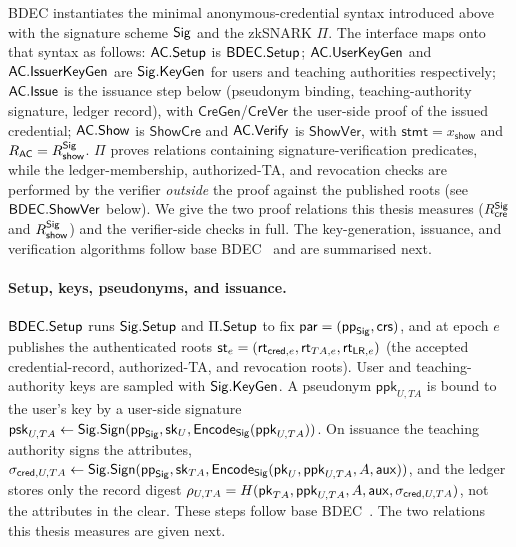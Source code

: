 \begin{construction}
BDEC instantiates the minimal anonymous-credential syntax introduced above with the signature scheme $\mathsf{Sig}$ and the zkSNARK $\Pi$. The interface maps onto that syntax as follows: $\mathsf{AC}.\mathsf{Setup}$ is $\mathsf{BDEC}.\mathsf{Setup}$; $\mathsf{AC}.\mathsf{UserKeyGen}$ and $\mathsf{AC}.\mathsf{IssuerKeyGen}$ are $\mathsf{Sig}.\mathsf{KeyGen}$ for users and teaching authorities respectively; $\mathsf{AC}.\mathsf{Issue}$ is the issuance step below (pseudonym binding, teaching-authority signature, ledger record), with $\mathsf{CreGen}$/$\mathsf{CreVer}$ the user-side proof of the issued credential; $\mathsf{AC}.\mathsf{Show}$ is $\mathsf{ShowCre}$ and $\mathsf{AC}.\mathsf{Verify}$ is $\mathsf{ShowVer}$, with $\mathsf{stmt}=x_{\mathsf{show}}$ and $R_{\mathsf{AC}}=R_{\mathsf{show}}^{\mathsf{Sig}}$. $\Pi$ proves relations containing signature-verification predicates, while the ledger-membership, authorized-TA, and revocation checks are performed by the verifier \emph{outside} the proof against the published roots (see $\mathsf{BDEC}.\mathsf{ShowVer}$ below). We give the two proof relations this thesis measures ($R_{\mathsf{cre}}^{\mathsf{Sig}}$ and $R_{\mathsf{show}}^{\mathsf{Sig}}$) and the verifier-side checks in full. The key-generation, issuance, and verification algorithms follow base BDEC~\cite{10.1007/978-981-96-0957-4_3} and are summarised next.

\paragraph{Setup, keys, pseudonyms, and issuance.}
$\mathsf{BDEC}.\mathsf{Setup}$ runs $\mathsf{Sig}.\mathsf{Setup}$ and $\Pi.\mathsf{Setup}$ to fix $\mathsf{par}=(\mathsf{pp}_{\mathsf{Sig}},\mathsf{crs})$, and at epoch $e$ publishes the authenticated roots $\mathsf{st}_e=(\mathsf{rt}_{\mathsf{cred},e},\mathsf{rt}_{TA,e},\mathsf{rt}_{\mathsf{LR},e})$ (the accepted credential-record, authorized-TA, and revocation roots). User and teaching-authority keys are sampled with $\mathsf{Sig}.\mathsf{KeyGen}$. A pseudonym $\mathsf{ppk}_{U,TA}$ is bound to the user's key by a user-side signature $\mathsf{psk}_{U,TA}\leftarrow\mathsf{Sig}.\mathsf{Sign}(\mathsf{pp}_{\mathsf{Sig}},\mathsf{sk}_U,\mathsf{Encode}_{\mathsf{Sig}}(\mathsf{ppk}_{U,TA}))$. On issuance the teaching authority signs the attributes, $\sigma_{\mathsf{cred},U,TA}\leftarrow\mathsf{Sig}.\mathsf{Sign}(\mathsf{pp}_{\mathsf{Sig}},\mathsf{sk}_{TA},\mathsf{Encode}_{\mathsf{Sig}}(\mathsf{pk}_U,\mathsf{ppk}_{U,TA},A,\mathsf{aux}))$, and the ledger stores only the record digest $\rho_{U,TA}=H(\mathsf{pk}_{TA},\mathsf{ppk}_{U,TA},A,\mathsf{aux},\sigma_{\mathsf{cred},U,TA})$, not the attributes in the clear. These steps follow base BDEC~\cite{10.1007/978-981-96-0957-4_3}. The two relations this thesis measures are given next.


\end{construction}
